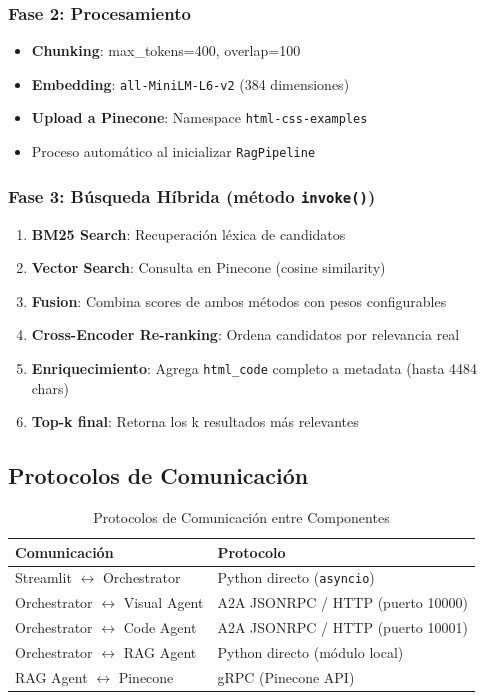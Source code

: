 \documentclass[12pt,a4paper]{article}
\begin{document}
\subsubsection{Fase 2: Procesamiento}
\begin{itemize}
    \item \textbf{Chunking}: max\_tokens=400, overlap=100
    \item \textbf{Embedding}: \texttt{all-MiniLM-L6-v2} (384 dimensiones)
    \item \textbf{Upload a Pinecone}: Namespace \texttt{html-css-examples}
    \item Proceso automático al inicializar \texttt{RagPipeline}
\end{itemize}

\subsubsection{Fase 3: Búsqueda Híbrida (método \texttt{invoke()})}
\begin{enumerate}
    \item \textbf{BM25 Search}: Recuperación léxica de candidatos
    \item \textbf{Vector Search}: Consulta en Pinecone (cosine similarity)
    \item \textbf{Fusion}: Combina scores de ambos métodos con pesos configurables
    \item \textbf{Cross-Encoder Re-ranking}: Ordena candidatos por relevancia real
    \item \textbf{Enriquecimiento}: Agrega \texttt{html\_code} completo a metadata (hasta 4484 chars)
    \item \textbf{Top-k final}: Retorna los k resultados más relevantes
\end{enumerate}

\subsection{Protocolos de Comunicación}

\begin{table}[H]
\centering
\caption{Protocolos de Comunicación entre Componentes}
\begin{tabular}{ll}
\toprule
\textbf{Comunicación} & \textbf{Protocolo} \\
\midrule
Streamlit $\leftrightarrow$ Orchestrator & Python directo (\texttt{asyncio}) \\
Orchestrator $\leftrightarrow$ Visual Agent & A2A JSONRPC / HTTP (puerto 10000) \\
Orchestrator $\leftrightarrow$ Code Agent & A2A JSONRPC / HTTP (puerto 10001) \\
Orchestrator $\leftrightarrow$ RAG Agent & Python directo (módulo local) \\
RAG Agent $\leftrightarrow$ Pinecone & gRPC (Pinecone API) \\
\bottomrule
\end{tabular}
\end{table}
\end{document}
